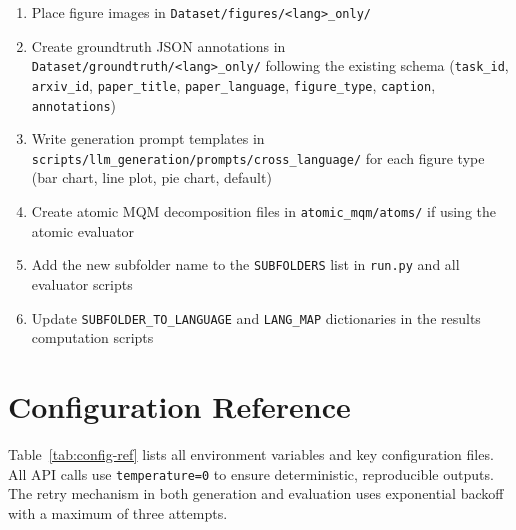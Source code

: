 \begin{enumerate}[leftmargin=*]
\item Place figure images in \texttt{Dataset/figures/<lang>\_only/}
\item Create groundtruth JSON annotations in \texttt{Dataset/groundtruth/<lang>\_only/} following the existing schema (\texttt{task\_id}, \texttt{arxiv\_id}, \texttt{paper\_title}, \texttt{paper\_language}, \texttt{figure\_type}, \texttt{caption}, \texttt{annotations})
\item Write generation prompt templates in \texttt{scripts/llm\_generation/prompts/cross\_language/} for each figure type (bar chart, line plot, pie chart, default)
\item Create atomic MQM decomposition files in \texttt{atomic\_mqm/atoms/} if using the atomic evaluator
\item Add the new subfolder name to the \texttt{SUBFOLDERS} list in \texttt{run.py} and all evaluator scripts
\item Update \texttt{SUBFOLDER\_TO\_LANGUAGE} and \texttt{LANG\_MAP} dictionaries in the results computation scripts
\end{enumerate}

\section{Configuration Reference}

Table~\ref{tab:config-ref} lists all environment variables and key configuration files. All API calls use \texttt{temperature=0} to ensure deterministic, reproducible outputs. The retry mechanism in both generation and evaluation uses exponential backoff with a maximum of three attempts.

